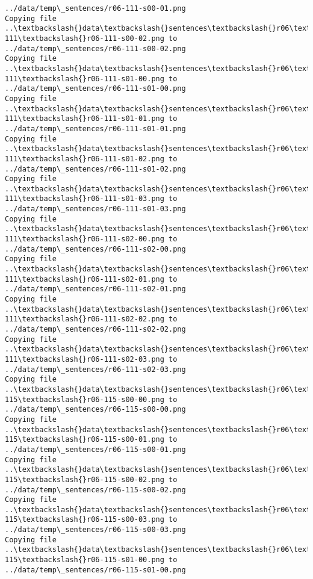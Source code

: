 \documentclass[11pt]{article}
\begin{document}
\begin{Verbatim}[commandchars=\\\{\}]
../data/temp\_sentences/r06-111-s00-01.png
Copying file ..\textbackslash{}data\textbackslash{}sentences\textbackslash{}r06\textbackslash{}r06-111\textbackslash{}r06-111-s00-02.png to
../data/temp\_sentences/r06-111-s00-02.png
Copying file ..\textbackslash{}data\textbackslash{}sentences\textbackslash{}r06\textbackslash{}r06-111\textbackslash{}r06-111-s01-00.png to
../data/temp\_sentences/r06-111-s01-00.png
Copying file ..\textbackslash{}data\textbackslash{}sentences\textbackslash{}r06\textbackslash{}r06-111\textbackslash{}r06-111-s01-01.png to
../data/temp\_sentences/r06-111-s01-01.png
Copying file ..\textbackslash{}data\textbackslash{}sentences\textbackslash{}r06\textbackslash{}r06-111\textbackslash{}r06-111-s01-02.png to
../data/temp\_sentences/r06-111-s01-02.png
Copying file ..\textbackslash{}data\textbackslash{}sentences\textbackslash{}r06\textbackslash{}r06-111\textbackslash{}r06-111-s01-03.png to
../data/temp\_sentences/r06-111-s01-03.png
Copying file ..\textbackslash{}data\textbackslash{}sentences\textbackslash{}r06\textbackslash{}r06-111\textbackslash{}r06-111-s02-00.png to
../data/temp\_sentences/r06-111-s02-00.png
Copying file ..\textbackslash{}data\textbackslash{}sentences\textbackslash{}r06\textbackslash{}r06-111\textbackslash{}r06-111-s02-01.png to
../data/temp\_sentences/r06-111-s02-01.png
Copying file ..\textbackslash{}data\textbackslash{}sentences\textbackslash{}r06\textbackslash{}r06-111\textbackslash{}r06-111-s02-02.png to
../data/temp\_sentences/r06-111-s02-02.png
Copying file ..\textbackslash{}data\textbackslash{}sentences\textbackslash{}r06\textbackslash{}r06-111\textbackslash{}r06-111-s02-03.png to
../data/temp\_sentences/r06-111-s02-03.png
Copying file ..\textbackslash{}data\textbackslash{}sentences\textbackslash{}r06\textbackslash{}r06-115\textbackslash{}r06-115-s00-00.png to
../data/temp\_sentences/r06-115-s00-00.png
Copying file ..\textbackslash{}data\textbackslash{}sentences\textbackslash{}r06\textbackslash{}r06-115\textbackslash{}r06-115-s00-01.png to
../data/temp\_sentences/r06-115-s00-01.png
Copying file ..\textbackslash{}data\textbackslash{}sentences\textbackslash{}r06\textbackslash{}r06-115\textbackslash{}r06-115-s00-02.png to
../data/temp\_sentences/r06-115-s00-02.png
Copying file ..\textbackslash{}data\textbackslash{}sentences\textbackslash{}r06\textbackslash{}r06-115\textbackslash{}r06-115-s00-03.png to
../data/temp\_sentences/r06-115-s00-03.png
Copying file ..\textbackslash{}data\textbackslash{}sentences\textbackslash{}r06\textbackslash{}r06-115\textbackslash{}r06-115-s01-00.png to
../data/temp\_sentences/r06-115-s01-00.png

\end{Verbatim}
\end{document}
